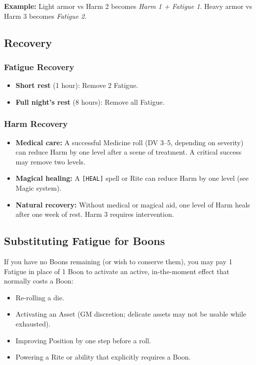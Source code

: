 \textbf{Example:} Light armor vs Harm 2 becomes \textit{Harm 1 + Fatigue 1}. Heavy armor vs Harm 3 becomes \textit{Fatigue 2}.

\subsection{Recovery}

\subsubsection{Fatigue Recovery}
\begin{itemize}
  \item \textbf{Short rest} (1 hour): Remove 2 Fatigue.
  \item \textbf{Full night's rest} (8 hours): Remove all Fatigue.
\end{itemize}

\subsubsection{Harm Recovery}
\begin{itemize}
  \item \textbf{Medical care:} A successful Medicine roll (DV 3--5, depending on severity) can reduce Harm by one level after a scene of treatment. A critical success may remove two levels.
  \item \textbf{Magical healing:} A \texttt{[HEAL]} spell or Rite can reduce Harm by one level (see Magic system).
  \item \textbf{Natural recovery:} Without medical or magical aid, one level of Harm heals after one week of rest. Harm 3 requires intervention.
\end{itemize}

\subsection{Substituting Fatigue for Boons}

If you have no Boons remaining (or wish to conserve them), you may pay 1 Fatigue in place of 1 Boon to activate an active, in-the-moment effect that normally costs a Boon:

\begin{itemize}
  \item Re-rolling a die.
  \item Activating an Asset (GM discretion; delicate assets may not be usable while exhausted).
  \item Improving Position by one step before a roll.
  \item Powering a Rite or ability that explicitly requires a Boon.
\end{itemize}

